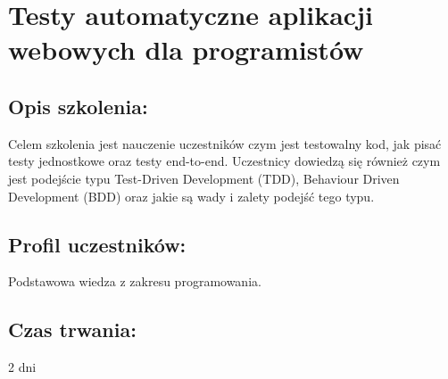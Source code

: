 \documentclass{article}[10pt]
\begin{document}
    
	\section{Testy automatyczne aplikacji webowych dla programistów
}

	\subsection*{Opis szkolenia:}
	\begin{adjustwidth}{2cm}{}
\justifying
		
Celem szkolenia jest nauczenie uczestników czym jest testowalny kod, jak pisać testy jednostkowe oraz testy end-to-end. Uczestnicy dowiedzą się również czym jest podejście typu Test-Driven Development (TDD),  Behaviour Driven Development (BDD) oraz jakie są wady i zalety podejść tego typu.

	\end{adjustwidth}
	\subsection*{Profil uczestników:}
\begin{adjustwidth}{2cm}{}
\justifying
	
Podstawowa wiedza z zakresu programowania.
\end{adjustwidth}
	\subsection*{Czas trwania:}
\begin{adjustwidth}{2cm}{}
	2 dni
\end{adjustwidth}
\end{document}
